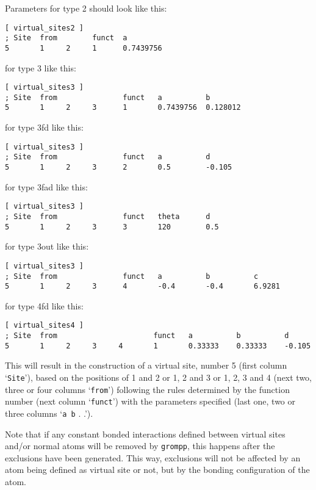 Parameters for type 2 should look like this:
{\small\begin{verbatim}
[ virtual_sites2 ] 
; Site  from        funct  a 
5       1     2     1      0.7439756
\end{verbatim}}

for type 3 like this:
{\small\begin{verbatim}
[ virtual_sites3 ]
; Site  from               funct   a          b
5       1     2     3      1       0.7439756  0.128012
\end{verbatim}}

for type 3fd like this:
{\small\begin{verbatim}
[ virtual_sites3 ]
; Site  from               funct   a          d
5       1     2     3      2       0.5        -0.105
\end{verbatim}}

for type 3fad like this:
{\small\begin{verbatim}
[ virtual_sites3 ]
; Site  from               funct   theta      d
5       1     2     3      3       120        0.5
\end{verbatim}}

for type 3out like this:
{\small\begin{verbatim}
[ virtual_sites3 ]
; Site  from               funct   a          b          c
5       1     2     3      4       -0.4       -0.4       6.9281
\end{verbatim}}

for type 4fd like this:
{\small\begin{verbatim}
[ virtual_sites4 ]
; Site  from                      funct   a          b          d
5       1     2     3     4       1       0.33333    0.33333    -0.105
\end{verbatim}}

This will result in the construction of a virtual site, number 5
(first column `{\tt Site}'), based on the positions of 1 and 2 or 1,
2 and 3 or 1, 2, 3 and 4 (next two, three or four columns
`{\tt from}') following the rules determined by the function number
(next column `{\tt funct}') with the parameters specified (last one,
two or three columns `{\tt a b} . .').

Note that if any constant bonded interactions defined between
virtual sites and/or normal atoms will be removed by {\tt grompp},
this happens after the exclusions have been generated.
This way, exclusions will not be affected by an atom being
defined as virtual site or not, but by the bonding configuration of the
atom.

